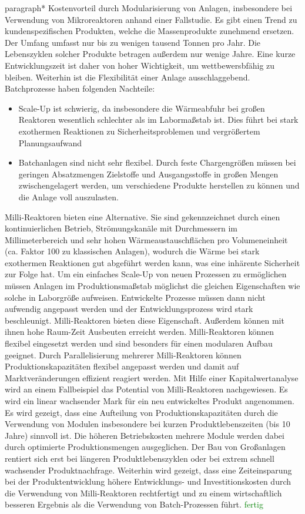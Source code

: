 paragraph*{\cite{Brodhagen_2012}} Kostenvorteil durch Modularisierung von Anlagen, insbesondere bei Verwendung von Mikroreaktoren anhand einer Fallstudie. \hfill \newline
Es gibt einen Trend zu kundenspezifischen Produkten, welche die Massenprodukte zunehmend ersetzen. Der Umfang umfasst nur bis zu wenigen tausend Tonnen pro Jahr. Die Lebenszyklen solcher Produkte betragen au\ss{}erdem nur wenige Jahre. Eine kurze Entwicklungszeit ist daher von hoher Wichtigkeit, um wettbewersbf\"ahig zu bleiben. Weiterhin ist die Flexibilit\"at einer Anlage ausschlaggebend. 
Batchprozesse haben folgenden Nachteile: \begin{itemize}
\item Scale-Up ist schwierig, da insbesondere die W\"armeabfuhr bei gro\ss{}en Reaktoren wesentlich schlechter als im Laborma\ss{}stab ist. Dies f\"uhrt bei stark exothermen Reaktionen zu Sicherheitsproblemen und vergr\"o\ss{}ertem Planungsaufwand
\item Batchanlagen sind nicht sehr flexibel. Durch feste Chargengr\"o\ss{}en m\"ussen bei geringen Absatzmengen Zielstoffe und Ausgangsstoffe in gro\ss{}en Mengen zwischengelagert werden, um verschiedene Produkte herstellen zu k\"onnen und die Anlage voll auszulasten.
\end{itemize}
Milli-Reaktoren bieten eine Alternative. Sie sind gekennzeichnet durch einen kontinuierlichen Betrieb, Str\"omungskan\"ale mit Durchmessern im Millimeterbereich und sehr hohen W\"armeaustauschfl\"achen pro Volumeneinheit (ca. Faktor 100 zu klassischen Anlagen), wodurch die W\"arme bei stark exothermen Reaktionen gut abgef\"uhrt werden kann, was eine inh\"arente Sicherheit zur Folge hat. 
Um ein einfaches Scale-Up von neuen Prozessen zu erm\"oglichen m\"ussen Anlagen im Produktionsma\ss{}stab m\"oglichst die gleichen Eigenschaften wie solche in Laborgr\"o\ss{}e aufweisen. Entwickelte Prozesse m\"ussen dann nicht aufwendig angepasst werden und der Entwicklungsprozess wird stark beschleunigt. Milli-Reaktoren bieten diese Eigenschaft. Au\ss{}erdem k\"onnen mit ihnen hohe Raum-Zeit Ausbeuten erreicht werden. Milli-Reaktoren k\"onnen flexibel eingesetzt werden und sind besonders f\"ur einen modularen Aufbau geeignet. Durch Parallelisierung mehrerer Milli-Reaktoren k\"onnen Produktionskapazit\"aten flexibel angepasst werden und damit auf Marktver\"anderungen effizient reagiert werden. Mit Hilfe einer Kapitalwertanalyse wird an einem Fallbeispiel das Potential von Milli-Reaktoren nachgewiesen. Es wird ein linear wachsender Mark f\"ur ein neu entwickeltes Produkt angenommen.  Es wird gezeigt, dass eine Aufteilung von Produktionskapazit\"aten durch die Verwendung von Modulen insbesondere bei kurzen Produktlebenszeiten (bis 10 Jahre) sinnvoll ist. Die h\"oheren Betriebskosten mehrere Module werden dabei durch optimierte Produktionsmengen ausgeglichen. Der Bau von Gro\ss{}anlagen rentiert sich erst bei l\"angeren Produktlebenszyklen oder bei extrem schnell wachsender Produktnachfrage. Weiterhin wird gezeigt, dass eine Zeiteinsparung bei der Produktentwicklung h\"ohere Entwicklungs- und Investitionskosten durch die Verwendung von Milli-Reaktoren rechtfertigt und zu einem wirtschaftlich besseren Ergebnis als die Verwendung von Batch-Prozessen f\"uhrt. 
 \textcolor{green}{fertig}
 
